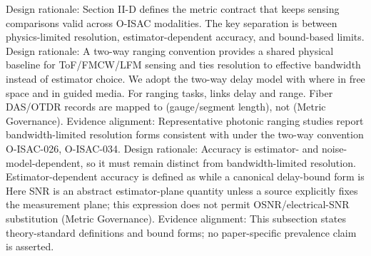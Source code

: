 {}Design rationale: Section II-D defines the metric contract that keeps sensing comparisons valid across O-ISAC modalities. The key separation is between physics-limited resolution, estimator-dependent accuracy, and bound-based limits.\markdownRendererInterblockSeparator
{}\markdownRendererSectionBegin
{}\markdownRendererInterblockSeparator
{}Design rationale: A two-way ranging convention provides a shared physical baseline for ToF/FMCW/LFM sensing and ties resolution to effective bandwidth instead of estimator choice.\markdownRendererParagraphSeparator
{}We adopt the two-way delay model with\markdownRendererSoftLineBreak
{}\markdownRendererSoftLineBreak
{}where  in free space and  in guided media. For ranging tasks,  links delay and range. Fiber DAS/OTDR records are mapped to  (gauge/segment length), not  (Metric Governance).\markdownRendererParagraphSeparator
{}Evidence alignment: Representative photonic ranging studies report bandwidth-limited resolution forms consistent with  under the two-way convention O-ISAC-026, O-ISAC-034.\markdownRendererInterblockSeparator
{}
\markdownRendererSectionEnd \markdownRendererSectionBegin
{}\markdownRendererInterblockSeparator
{}Design rationale: Accuracy is estimator- and noise-model-dependent, so it must remain distinct from bandwidth-limited resolution.\markdownRendererParagraphSeparator
{}Estimator-dependent accuracy is defined as\markdownRendererSoftLineBreak
{}\markdownRendererSoftLineBreak
{}while a canonical delay-bound form is\markdownRendererSoftLineBreak
{}\markdownRendererSoftLineBreak
{}Here SNR is an abstract estimator-plane quantity unless a source explicitly fixes the measurement plane; this expression does not permit OSNR/electrical-SNR substitution (Metric Governance).\markdownRendererParagraphSeparator
{}Evidence alignment: This subsection states theory-standard definitions and bound forms; no paper-specific prevalence claim is asserted.\markdownRendererInterblockSeparator
